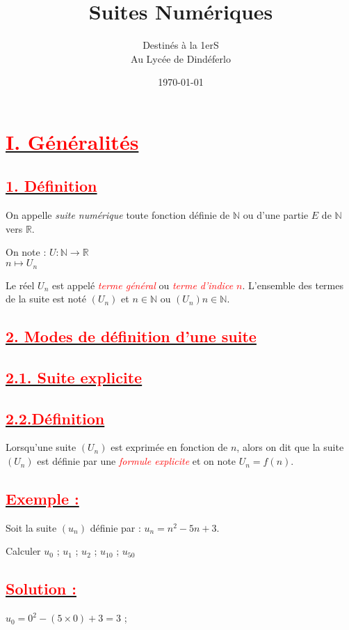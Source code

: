 \documentclass[12pt]{article}
\author{Destinés à la 1erS\\Au Lycée de Dindéferlo}
\title{\textbf{Suites Numériques }}
\date{\today}
\begin{document}
\maketitle
\newpage
\section*{\underline{\textbf{\textcolor{red}{I. Généralités}}}}
\subsection*{\underline{\textbf{\textcolor{red}{1. Définition}}}}
On appelle \textit{suite numérique} toute fonction définie de $\mathbb{N}$ ou d'une partie $E$ de $\mathbb{N}$ vers $\mathbb{R}$.

On note : $U : \mathbb{N} \rightarrow \mathbb{R}$ \\
\hspace*{3.3cm}$n \mapsto U_{n}$

Le réel $U_n$ est appelé  \textcolor{red}{\textit{terme général}} ou  \textcolor{red}{\textit{terme d'indice $n$}}.
L'ensemble des termes de la suite est noté $(U_n)$ et $n \in \mathbb{N}$ ou $(U_{n})n\in\mathbb{N}$.
\subsection*{\underline{\textbf{\textcolor{red}{2. Modes de définition d'une suite }}}}
\subsection*{\underline{\textbf{\textcolor{red}{2.1. Suite explicite}}}}
\subsection*{\underline{\textbf{\textcolor{red}{2.2.Définition}}}}
Lorsqu'une suite $(U_{n})$ est exprimée en fonction de $n$, alors on dit que la suite $(U_{n})$ est définie par une \textcolor{red}{\textit{formule explicite}} et on note $U_{n} = f(n)$.
\subsection*{\underline{\textbf{\textcolor{red}{Exemple :}}}}
Soit la suite $\left(u_{n}\right)$ définie par : $u_{n}=n^{2}-5n+3.$

Calculer 
$u_{0}$ ; $u_{1}$ ;	$u_{2}$ ; $u_{10}$ ; $u_{50}$
\subsection*{\underline{\textbf{\textcolor{red}{Solution :}}}}
$u_{0}=0^{2}-(5\times 0)+3=3$ ;
	
\end{document}

